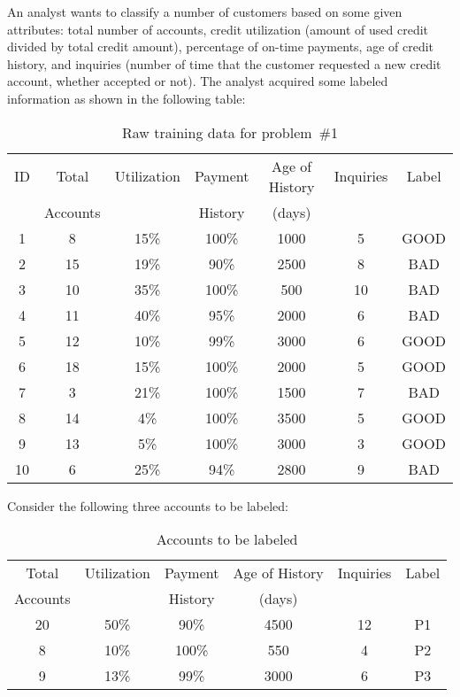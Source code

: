 \begin{problem}
An analyst wants to classify a number of customers based on some given attributes: total number of accounts, credit utilization (amount of used credit divided by total credit amount), percentage of on-time payments, age of credit history, and inquiries (number of time that the customer requested a new credit account, whether accepted or not). The analyst acquired some labeled information as shown in the following table:

\begin{table}[h]
  \centering
  \caption{Raw training data for problem~\#1}\label{tab:P01:RawTraining}
  \begin{tabular}{|c||c|c|c|c|c|c|}
    \hline
    ID & Total    & Utilization & Payment & Age of History & Inquiries & Label \\
       & Accounts &             & History & (days)         &           & \\\hline\hline
    1 & 8 & 15\% & 100\% & 1000 & 5 & GOOD \\\hline
    2 & 15 & 19\% & 90\% & 2500 & 8 & BAD \\\hline
    3 & 10 & 35\% & 100\% & 500 & 10 & BAD \\\hline
    4 & 11 & 40\% & 95\% & 2000 & 6 & BAD \\\hline
    5 & 12 & 10\% & 99\% & 3000 & 6 & GOOD \\\hline
    6 & 18 & 15\% & 100\% & 2000 & 5 & GOOD \\\hline
    7 & 3 & 21\% & 100\% & 1500 & 7 & BAD \\\hline
    8 & 14 & 4\% & 100\% & 3500 & 5 & GOOD \\\hline
    9 & 13 & 5\% & 100\% & 3000 & 3 & GOOD \\\hline
    10 & 6 & 25\% & 94\% & 2800 & 9 & BAD \\\hline
  \end{tabular}
\end{table}


Consider the following three accounts to be labeled:

\begin{table}[h]
  \centering
  \caption{Accounts to be labeled}\label{tab:P01:AccountsToLabel}
  \begin{tabular}{|c|c|c|c|c|c|}
    \hline
    Total    & Utilization & Payment & Age of History & Inquiries & Label \\
    Accounts &             & History & (days)         &           & \\\hline\hline
    20 & 50\% & 90\% & 4500 & 12 & P1 \\\hline
    8 & 10\% & 100\% & 550 & 4 & P2 \\\hline
    9 & 13\% & 99\% & 3000 & 6 & P3 \\\hline
  \end{tabular}
\end{table}
\end{problem}

